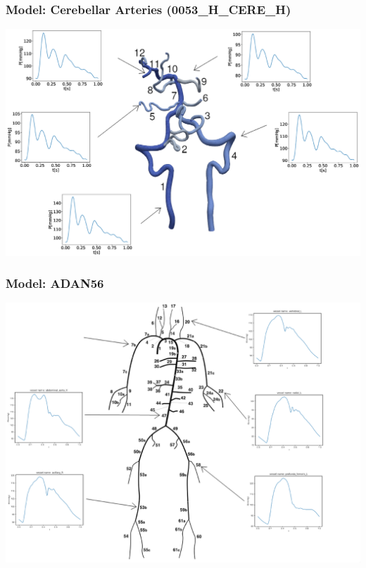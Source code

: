 \documentclass{beamer}
\begin{document}
\begin{frame}
	\frametitle{Model: Cerebellar Arteries (0053\_H\_CERE\_H)}
	\includegraphics[width=\columnwidth]{images/0053.eps}
\end{frame}
\begin{frame}
	\frametitle{Model: ADAN56}
	\includegraphics[width=\textwidth]{images/adan56.eps}
\end{frame}
\end{document}

